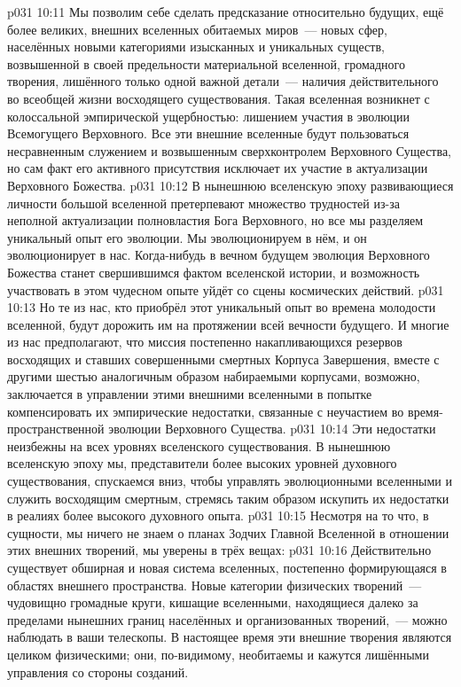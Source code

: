 \vs p031 10:11 Мы позволим себе сделать предсказание относительно будущих, ещё более великих, внешних вселенных обитаемых миров~--- новых сфер, населённых новыми категориями изысканных и уникальных существ, возвышенной в своей предельности материальной вселенной, громадного творения, лишённого только одной важной детали~--- наличия действительного  во всеобщей жизни восходящего существования. Такая вселенная возникнет с колоссальной эмпирической ущербностью: лишением участия в эволюции Всемогущего Верховного. Все эти внешние вселенные будут пользоваться несравненным служением и возвышенным сверхконтролем Верховного Существа, но сам факт его активного присутствия исключает их участие в актуализации Верховного Божества.
\vs p031 10:12 В нынешнюю вселенскую эпоху развивающиеся личности большой вселенной претерпевают множество трудностей из\hyp{}за неполной актуализации полновластия Бога Верховного, но все мы разделяем уникальный опыт его эволюции. Мы эволюционируем в нём, и он эволюционирует в нас. Когда\hyp{}нибудь в вечном будущем эволюция Верховного Божества станет свершившимся фактом вселенской истории, и возможность участвовать в этом чудесном опыте уйдёт со сцены космических действий.
\vs p031 10:13 Но те из нас, кто приобрёл этот уникальный опыт во времена молодости вселенной, будут дорожить им на протяжении всей вечности будущего. И многие из нас предполагают, что миссия постепенно накапливающихся резервов восходящих и ставших совершенными смертных Корпуса Завершения, вместе с другими шестью аналогичным образом набираемыми корпусами, возможно, заключается в управлении этими внешними вселенными в попытке компенсировать их эмпирические недостатки, связанные с неучастием во время\hyp{}пространственной эволюции Верховного Существа.
\vs p031 10:14 Эти недостатки неизбежны на всех уровнях вселенского существования. В нынешнюю вселенскую эпоху мы, представители более высоких уровней духовного существования, спускаемся вниз, чтобы управлять эволюционными вселенными и служить восходящим смертным, стремясь таким образом искупить их недостатки в реалиях более высокого духовного опыта.
\vs p031 10:15 Несмотря на то что, в сущности, мы ничего не знаем о планах Зодчих Главной Вселенной в отношении этих внешних творений, мы уверены в трёх вещах:
\vs p031 10:16 Действительно существует обширная и новая система вселенных, постепенно формирующаяся в областях внешнего пространства. Новые категории физических творений~--- чудовищно громадные круги, кишащие вселенными, находящиеся далеко за пределами нынешних границ населённых и организованных творений,~--- можно наблюдать в ваши телескопы. В настоящее время эти внешние творения являются целиком физическими; они, по\hyp{}видимому, необитаемы и кажутся лишёнными управления со стороны созданий.
